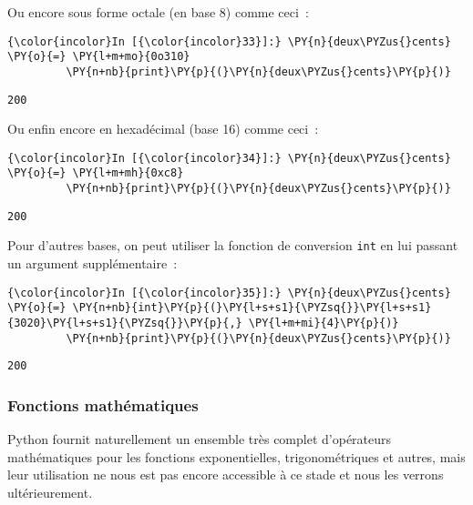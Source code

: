     Ou encore sous forme octale (en base 8) comme ceci~:

    \begin{Verbatim}[commandchars=\\\{\}]
{\color{incolor}In [{\color{incolor}33}]:} \PY{n}{deux\PYZus{}cents} \PY{o}{=} \PY{l+m+mo}{0o310}
         \PY{n+nb}{print}\PY{p}{(}\PY{n}{deux\PYZus{}cents}\PY{p}{)}
\end{Verbatim}


    \begin{Verbatim}[commandchars=\\\{\}]
200

    \end{Verbatim}

    Ou enfin encore en hexadécimal (base 16) comme ceci~:

    \begin{Verbatim}[commandchars=\\\{\}]
{\color{incolor}In [{\color{incolor}34}]:} \PY{n}{deux\PYZus{}cents} \PY{o}{=} \PY{l+m+mh}{0xc8}
         \PY{n+nb}{print}\PY{p}{(}\PY{n}{deux\PYZus{}cents}\PY{p}{)}
\end{Verbatim}


    \begin{Verbatim}[commandchars=\\\{\}]
200

    \end{Verbatim}

    Pour d'autres bases, on peut utiliser la fonction de conversion
\texttt{int} en lui passant un argument supplémentaire~:

    \begin{Verbatim}[commandchars=\\\{\}]
{\color{incolor}In [{\color{incolor}35}]:} \PY{n}{deux\PYZus{}cents} \PY{o}{=} \PY{n+nb}{int}\PY{p}{(}\PY{l+s+s1}{\PYZsq{}}\PY{l+s+s1}{3020}\PY{l+s+s1}{\PYZsq{}}\PY{p}{,} \PY{l+m+mi}{4}\PY{p}{)}
         \PY{n+nb}{print}\PY{p}{(}\PY{n}{deux\PYZus{}cents}\PY{p}{)}
\end{Verbatim}


    \begin{Verbatim}[commandchars=\\\{\}]
200

    \end{Verbatim}

    \hypertarget{fonctions-mathuxe9matiques}{%
\subsubsection{Fonctions
mathématiques}\label{fonctions-mathuxe9matiques}}

    Python fournit naturellement un ensemble très complet d'opérateurs
mathématiques pour les fonctions exponentielles, trigonométriques et
autres, mais leur utilisation ne nous est pas encore accessible à ce
stade et nous les verrons ultérieurement.